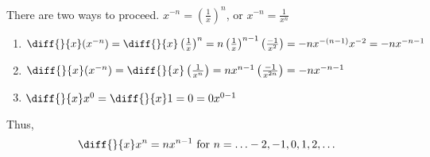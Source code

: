 There are two ways to proceed. $x^{-n} = \left( \frac{1}{x} \right)^n$, or $x^{-n} = \frac{1}{x^n}$

\begin{enumerate}
	\item $ \diff{}{x} (x^{-n}) 
		= \diff{}{x} \left( \frac{1}{x} \right)^n 
		= n \left( \frac{1}{x} \right)^{n-1} \left( \frac{-1}{x^2} \right) 
		= -nx^{-(n-1)}x^{-2}
		= -nx^{-n-1}
		$
	\item $ \diff{}{x} (x^{-n}) 
		= \diff{}{x} \left( \frac{1}{x^n} \right)
		= nx^{n-1} \left( \frac{-1}{x^{2n}} \right)
		= -nx^{-n-1}
		$
	\item $ \diff{}{x} x^0 = \diff{}{x} 1 = 0 = 0x^{0-1} $
\end{enumerate}



Thus, $$ \diff{}{x} x^n = nx^{n-1} \text{ for } n = \ldots -2, -1, 0, 1, 2, \ldots $$